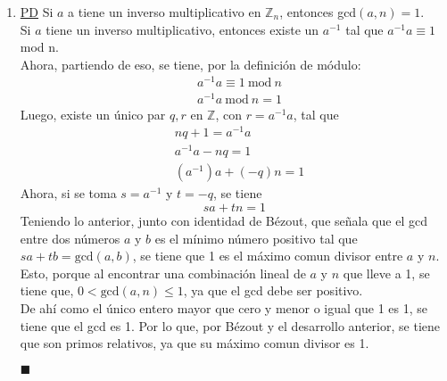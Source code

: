 \documentclass[letter]{article}
\begin{document}
	\begin{pregunta}{1} %
		\begin{enumerate}
		\item 
		\underline{PD} Si $a$ a tiene un inverso multiplicativo en $\mathbb{Z}_n$, entonces gcd$(a,n)=1$.\\
		Si $a$ tiene un inverso multiplicativo, entonces existe un $a^{-1}$ tal que $a^{-1}a \equiv 1$ mod n.\\
		Ahora, partiendo de eso, se tiene, por la definición de módulo:
		\begin{align*}
			&a^{-1}a \equiv 1 \ \text{mod} \ n \\
			&a^{-1}a\  \text{mod} \ n = 1
		\end{align*}
		Luego, existe un único par $q, r$ en $\mathbb{Z}$, con $r=a^{-1}a$, tal que
		\begin{align*}
			&nq + 1 = a^{-1}a\\
			&a^{-1}a - nq = 1\\
			&(a^{-1})a + (-q)n = 1
		\end{align*}
		Ahora, si se toma $s=a^{-1}$ y $t=-q$, se tiene
		$$sa + tn = 1$$
		Teniendo lo anterior, junto con identidad de Bézout, que señala que el gcd entre dos números $a$ y $b$ es el mínimo número positivo tal que $sa+tb=\text{gcd}(a,b)$, se tiene que 1 es el máximo comun divisor entre $a$ y $n$. Esto, porque al encontrar una combinación lineal de $a$ y $n$ que lleve a 1, se tiene que, $0 < \text{gcd}(a, n) \leq 1$, ya que el gcd debe ser positivo.\\
		De ahí como el único entero mayor que cero y menor o igual que 1 es 1, se tiene que el gcd es 1. Por lo que, por Bézout y el desarrollo anterior, se tiene que son primos relativos, ya que su máximo comun divisor es 1.\begin{flushright}$\blacksquare$\end{flushright}


\end{enumerate}
\end{pregunta}
\end{document}
